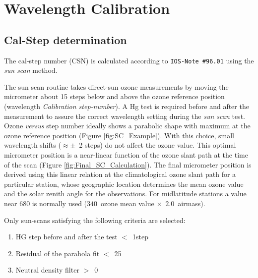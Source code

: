 




\section{Wavelength Calibration} \label{sec:WVL}

\subsection{Cal-Step determination} \label{subsec:CSN}
The cal-step number (CSN) is calculated according to \texttt{IOS-Note\,\#96.01} using the \textit{sun scan} method.

The sun scan routine takes direct-sun ozone measurements by moving the micrometer about 15 steps below and above the ozone reference position (wavelength \textit{Calibration step-number}). A Hg test is required before and after the mea\-su\-re\-ment to assure the correct wavelength setting du\-ring the \emph{sun scan} test.\\
Ozone \emph{versus} step number ideally shows a parabolic shape with maximum at the ozone re\-fe\-ren\-ce position (Figure \ref{fig:SC_Example}). With this choice, small wavelength shifts ($\approx \pm$\ 2 steps) do not a\-ffect the ozone value. 
This optimal micrometer position is a near-linear function of the ozone slant path at the time of the scan (Figure \ref{fig:Final_SC_Calculation}).
The final micrometer position is derived using this linear relation at the climatological ozone slant path for a particular station, whose geographic location determines the mean ozone value and the solar zenith angle for the observations. For midlatitude stations a value near 680 is normally used ($340$\ ozone mean value $\times$\ $2.0$\ airmass).

Only sun-scans satisfying the following criteria are selected:
\begin{enumerate}[itemsep=0cm]
	\item HG step before and after the test $<$\ 1step
	\item Residual of the parabola fit $<$\ 25
	\item Neutral density filter $>$\ 0
\end{enumerate}


